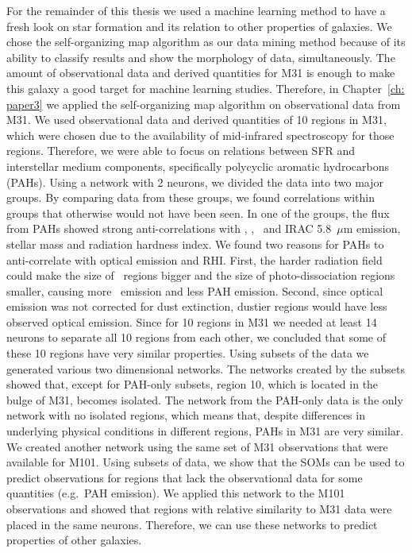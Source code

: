 For the remainder of this thesis we used a machine learning method to have a fresh look on star formation and its relation to other properties of galaxies.
We chose the self-organizing map algorithm as our data mining method because of its ability to classify results and show the morphology of data, simultaneously.
The amount of observational data and derived quantities for M31 is enough to make this galaxy a good target for machine learning studies.
Therefore, in Chapter~\ref{ch: paper3} we applied the self-organizing map algorithm on observational data from M31.
We used observational data and derived quantities of 10 regions in M31, which were chosen due to the availability of mid-infrared spectroscopy for those regions.
Therefore, we were able to focus on relations between SFR and interstellar medium components, specifically polycyclic aromatic hydrocarbons (PAHs).
Using a network with 2 neurons, we divided the data into two major groups.
By comparing data from these groups, we found correlations within groups that otherwise would not have been seen.
In one of the groups, the flux from PAHs showed strong anti-correlations with \halpha, \sii, \oiii~and IRAC 5.8~$\mu$m emission, stellar mass and radiation hardness index.
We found two reasons for PAHs to anti-correlate with optical emission and RHI.
First, the harder radiation field could make the size of \hii~regions bigger and the size of photo-dissociation regions smaller, causing more \halpha~emission and less PAH emission.
Second, since optical emission was not corrected for dust extinction, dustier regions would have less observed optical emission.
Since for 10 regions in M31 we needed at least 14 neurons to separate all 10 regions from each other, we concluded that some of these 10 regions have very similar properties.
Using subsets of the data we generated various two dimensional networks.
The networks created by the subsets showed that, except for PAH-only subsets, region 10, which is located in the bulge of M31, becomes isolated.
The network from the PAH-only data is the only network with no isolated regions, which means that, despite differences in underlying physical conditions in different regions, PAHs in M31 are very similar.
We created another network using the same set of M31 observations that were available for M101.
Using subsets of data, we show that the SOMs can be used to predict observations for regions that lack the observational data for some quantities (e.g.\ PAH emission).
We applied this network to the M101 observations and showed that regions with relative similarity to M31 data were placed in the same neurons.
Therefore, we can use these networks to predict properties of other galaxies.


